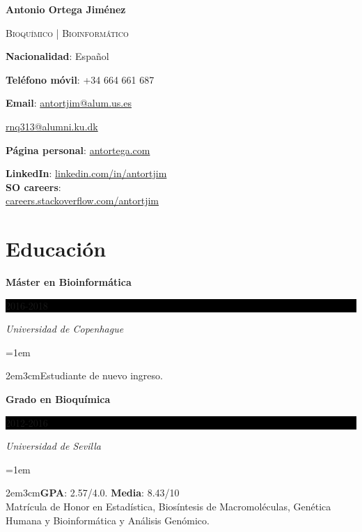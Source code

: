 \documentclass[paper=a4,fontsize=11pt]{article} %
\newcommand{\sepspace}{\vspace*{1em}}		%
\newcommand{\MyName}[1]{ %
		\Huge \usefont{OT1}{phv}{b}{n} \hfill #1
		\par \normalsize \normalfont}
\newcommand{\MySlogan}[1]{ %
		\large \usefont{OT1}{phv}{m}{n}\hfill \textit{#1}
		\par \normalsize \normalfont}
\newcommand{\NewPart}[1]{\section*{
									{#1}}}
\newcommand{\EducationEntry}[4]{
		\noindent \textbf{#1} \hfill      %
		\colorbox{Black}{%
			\parbox{6em}{%
			\hfill\color{White}#2}} \par  %
		\noindent \textit{#3} \par        %
		\noindent\hangindent=1em\hangafter=0 \small \begin{changemargin}{2em}{3cm}#4 \end{changemargin} %
		\normalsize \par}
\begin{document}

%


\def\name{\textcolor{StrongRed}{Antonio Ortega Jim\'enez}}

\centerline{\LARGE\bf \name}
\vspace{0.1in}
\centerline{\textcolor{awesome-red}{\textsc{Bioquímico | Bioinformático}}}
\vspace{0.25in}



\begin{minipage}[t]{0.6\textwidth}
  \textbf{Nacionalidad}: Español \par
  \textbf{Teléfono móvil}: +34 664 661 687 \par
  \textbf{Email}: \href{mailto:antortjim@alum.us.es}{antortjim@alum.us.es} \par
  \leftskip=1.1cm  \href{mailto:rnq313@alumni.ku.dk}{rnq313@alumni.ku.dk} \par
  \leftskip=0cm \textbf{Página personal}: \href{http://www.antortega.com}{antortega.com} \par
  
\end{minipage}
\begin{minipage}[t]{0.3\textwidth}
  \textbf{LinkedIn}: \href{http://www.linkedin.com/in/antortjim}{linkedin.com/in/antortjim} \\
   \textbf{SO careers}:\\
   \href{http://careers.stackoverflow.com/antortjim}{careers.stackoverflow.com/antortjim} \\
\end{minipage}

\NewPart{Educación}{}

\EducationEntry{Máster en Bioinformática}{2016-2018}{Universidad de Copenhague}{Estudiante de nuevo ingreso.}
\sepspace

\EducationEntry{Grado en Bioquímica}{2012-2016}{Universidad de Sevilla}{\textbf{GPA}: 2.57/4.0. \textbf{Media}: 8.43/10 \\
  Matrícula de Honor en Estadística, Biosíntesis de Macromoléculas, Genética Humana y Bioinformática y Análisis Genómico.}
\sepspace
  
\end{document}
